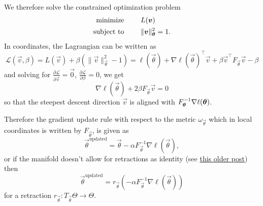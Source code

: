 \documentclass[12pt]{amsart}
\begin{document}
 We therefore solve the constrained optimization problem
\begin{align}\label{eq:constrainedOptimization}
	\text{minimize } \qquad  & L(\vec{v}) \notag \\
	\text{subject to } \qquad & \|\vec{v}\|_{\vec{\theta}}^2 = 1.
\end{align} 	
In coordinates, the Lagrangian can be written as 
\[
	\mathcal{L}(\vec{v}, \beta) = L(\vec{v}) + \beta(\|\vec{v}\|_{\vec{\theta}}^2 - 1) = \ell(\vec{\theta}) + \nabla \ell(\vec{\theta})^\top \vec{v} + \beta \vec{v}^\top F_{\vec{\theta}} \vec{v} - \beta
\]
and solving for $\frac{\partial \mathcal{L}}{\partial \vec{v}} = \vec{0}$, $\frac{\partial \mathcal{L}}{\partial \beta} = 0$, we get
\[
	\nabla\ell(\vec{\theta}) + 2 \beta F_\vec{\theta} \vec{v} = 0
\]
so that the steepest descent direction $\vec{v}$ is aligned with $F_{\vec{\theta}}\inv \nabla \ell(\vec{\theta})$. 

Therefore the gradient update rule with respect to the metric $\omega_{\vec{\theta}}$ which in local coordinates is written by $F_{\vec{\theta}}$,  is given as
\begin{equation}\label{eq:riemannianGD}
	\vec{\theta}^{\text{updated}} = \vec{\theta} - \alpha F_{\vec{\theta}}^{-1} \nabla \ell(\vec{\theta}),
\end{equation}
or if the manifold doesn't allow for retractions as identity (see \href{https://ekiral.github.io/blog/2025-06-05_notation.html}{this older post}) then 
\begin{equation}\label{eq:riemannianGDretraction}
	\vec{\theta}^{\text{updated}} = r_{\vec{\theta}}(- \alpha F_{\vec{\theta}}^{-1}\nabla \ell(\vec{\theta}))
\end{equation}
for a retraction $r_{\vec{\theta}} : T_{\vec{\theta}}\Theta \to \Theta$. 
\end{document}
